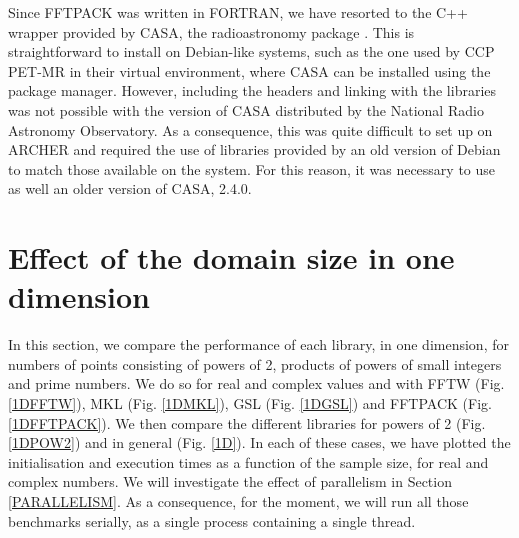 \documentclass[12pt, a4paper]{article}
\begin{document}
Since FFTPACK was written in FORTRAN, we have resorted to the C++ wrapper provided by CASA, the radioastronomy package \cite{casa}. This is straightforward to install on Debian-like systems, such as the one used by CCP PET-MR in their virtual environment, where CASA can be installed using the package manager. However, including the headers and linking with the libraries was not possible with the version of CASA distributed by the National Radio Astronomy Observatory. As a consequence, this was quite difficult to set up on ARCHER and required the use of libraries provided by an old version of Debian to match those available on the system. For this reason, it was necessary to use as well an older version of CASA, 2.4.0.

\pagebreak
\section{Effect of the domain size in one dimension}\label{PERFORMANCE1D}

In this section, we compare the performance of each library, in one dimension, for numbers of points consisting of powers of 2, products of powers of small integers and prime numbers. We do so for real and complex values and with FFTW (Fig. \ref{1DFFTW}), MKL (Fig. \ref{1DMKL}), GSL (Fig. \ref{1DGSL}) and FFTPACK (Fig. \ref{1DFFTPACK}). We then compare the different libraries for powers of 2 (Fig. \ref{1DPOW2}) and in general (Fig. \ref{1D}). In each of these cases, we have plotted the initialisation and execution times as a function of the sample size, for real and complex numbers. We will investigate the effect of parallelism in Section \ref{PARALLELISM}. As a consequence, for the moment, we will run all those benchmarks serially, as a single process containing a single thread.\\
\end{document}
